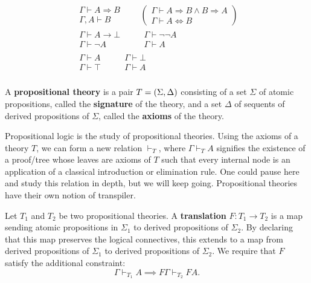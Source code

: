 \documentclass[../main.tex]{subfiles}
\begin{document}
\begin{gather*}
  \begin{array}{c}
    \Gamma \vdash A \Rightarrow B \\\hline \Gamma, A \vdash B
  \end{array}\quad\quad
  \left(
    \begin{array}{c}
      \Gamma \vdash A \Rightarrow B \wedge B \Rightarrow A \\\hline\hline \Gamma \vdash A
      \Leftrightarrow B
    \end{array}
  \right)\\
  \begin{array}{c}
    \Gamma \vdash A \to \bot \\\hline\hline \Gamma \vdash \neg A
  \end{array}\quad\quad
  \begin{array}{c}
    \Gamma \vdash \neg \neg A \\\hline \Gamma \vdash A
  \end{array}\\
  \begin{array}{c}
    \Gamma \vdash A \\\hline \Gamma \vdash \top
  \end{array}\quad\quad
  \begin{array}{c}
    \Gamma \vdash \bot \\\hline \Gamma \vdash A
  \end{array}\\
\end{gather*}
\begin{definition}
  A \textbf{propositional theory} is a pair \(T = {\left(\Sigma,\Delta\right)}\)
  consisting of a set \(\Sigma\) of atomic propositions, called the
  \textbf{signature} of the theory, and a set \(\Delta\) of sequents of derived
  propositions of \(\Sigma\), called the \textbf{axioms} of the theory.
\end{definition}
Propositional logic is the study of propositional theories. Using the axioms of
a theory \(T\), we can form a new relation \(\vdash_T\), where \(\Gamma \vdash_T
A\) signifies the existence of a proof\-/tree whose leaves are axioms of \(T\)
such that every internal node is an application of a classical introduction or
elimination rule. One could pause here and study this relation in depth, but we
will keep going. Propositional theories have their own notion of transpiler.
\begin{definition}
  Let \(T_1\) and \(T_2\) be two propositional theories. A \textbf{translation}
  \(F: T_1 \to T_2\) is a map sending atomic propositions in \(\Sigma_1\) to
  derived propositions of \(\Sigma_2\). By declaring that this map preserves the
  logical connectives, this extends to a map from derived propositions of
  \(\Sigma_1\) to derived propositions of \(\Sigma_2\). We require that \(F\)
  satisfy the additional constraint:
  \[%
    \Gamma \vdash_{T_1} A \implies F\Gamma \vdash_{T_2} F A.
  \]%
\end{definition}
\end{document}
